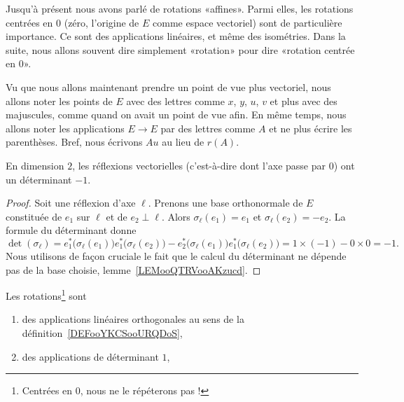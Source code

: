 \begin{normaltext}      \label{NORMooOUDJooRfbDEX}
    Jusqu'à présent nous avons parlé de rotations «affines». Parmi elles, les rotations centrées en \( 0\) (zéro, l'origine de \( E\) comme espace vectoriel) sont de particulière importance. Ce sont des applications linéaires, et même des isométries. Dans la suite, nous allons souvent dire simplement «rotation» pour dire «rotation centrée en \( 0\)».

    Vu que nous allons maintenant prendre un point de vue plus vectoriel, nous allons noter les points de \( E\) avec des lettres comme \( x\), \( y\), \( u\), \( v\) et plus avec des majuscules, comme quand on avait un point de vue afin. En même temps, nous allons noter les applications \( E\to E \) par des lettres comme \( A\) et ne plus écrire les parenthèses. Bref, nous écrivons \( Au\) au lieu de \( r(A)\).
\end{normaltext}

\begin{lemma}       \label{LEMooSYZYooWDFScw}
    En dimension \( 2\), les réflexions vectorielles (c'est-à-dire dont l'axe passe par \( 0\)) ont un déterminant \( -1\).
\end{lemma}

\begin{proof}
    Soit une réflexion d'axe \( \ell\). Prenons une base orthonormale de \( E\) constituée de \( e_1\) sur \( \ell\) et de \( e_2\perp \ell\). Alors \( \sigma_{\ell}(e_1)=e_1\) et \( \sigma_{\ell}(e_2)=-e_2\). La formule du déterminant donne
    \begin{equation}
        \det(\sigma_{\ell})=e_1^*\big( \sigma_{\ell}(e_1) \big)e_1^*\big( \sigma_{\ell}(e_2) \big)-e_2^*\big( \sigma_{\ell}(e_1) \big)e_1^*\big( \sigma_{\ell}(e_2) \big)=1\times (-1)-0\times 0=-1.
    \end{equation}
    Nous utilisons de façon cruciale le fait que le calcul du déterminant ne dépende pas de la base choisie, lemme~\ref{LEMooQTRVooAKzucd}.
\end{proof}

\begin{proposition}     \label{PROPooTUJWooAjtEnQ}
    Les rotations\footnote{Centrées en \( 0\), nous ne le répéterons pas !} sont
    \begin{enumerate}
        \item
            des applications linéaires orthogonales au sens de la définition~\ref{DEFooYKCSooURQDoS},
        \item
             des applications de déterminant \( 1\),
    \end{enumerate}
\end{proposition}

